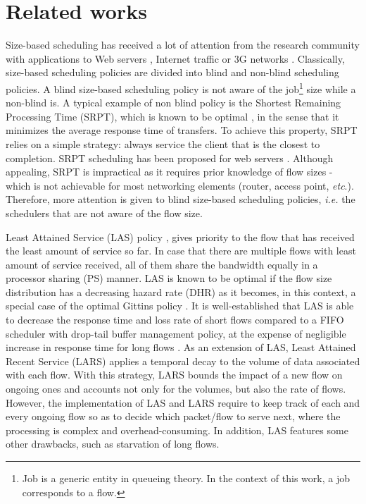 \documentclass[preprint,12pt]{elsarticle}
\begin{document}
\section{Related works}
\label{sec:related}
Size-based scheduling has received a lot of attention from the research community with applications to Web servers \cite{SRPT_Web2006}, Internet traffic \cite{Avrachenkov04Run2c,Rai2004Performance,Keller2008Improving} or 3G networks \cite{Aalto2007Impact,Lassila2008Combining}. Classically, size-based scheduling policies are divided into blind and non-blind scheduling policies. A blind size-based scheduling policy is not aware of the job\footnote{Job is a generic entity in queueing theory. In the context of this work, a job corresponds to a flow.} size while a non-blind is. A typical example of non blind policy is the Shortest Remaining Processing Time (SRPT), which is known to be optimal \cite{Schrage1968SRPT}, in the sense that it minimizes the average response time of transfers. To achieve this property, SRPT relies on a simple strategy: always service the client that is the closest to completion. SRPT scheduling has been proposed for web servers \cite{Chen03cnetworks,Harchol2003}. Although appealing, SRPT is impractical as it requires prior knowledge of flow sizes - which is not achievable for most networking elements (router, access point, \textit{etc}.). Therefore, more attention is given to blind size-based scheduling policies, \textit{i.e.} the schedulers that are not aware of the flow size.

 Least Attained Service (LAS) policy \cite{Rai02size-basedscheduling}, gives priority to the flow that has received the least amount of service so far. In case that there are multiple flows with least amount of service received, all of them share the bandwidth equally in a processor sharing (PS) manner. LAS is known to be optimal if the flow size distribution has a decreasing hazard rate (DHR) \cite{Nuyens2008FB} as it becomes, in this context, a special case of the optimal Gittins policy \cite{Gittins89}.  It is well-established that LAS is able to decrease the response time and loss rate of short flows compared to a FIFO scheduler with drop-tail buffer management policy, at the expense of negligible increase in response time for long flows \cite{Rai02size-basedscheduling,Rai04size-basedscheduling,Rai04performancemodels}. As an extension of LAS, Least Attained Recent Service (LARS) \cite{Martin10Lars} applies a temporal decay to the volume of data associated with each flow. With this strategy, LARS bounds the impact of a new flow on ongoing ones and accounts not only for the volumes, but also the rate of flows. However, the implementation of LAS and LARS require to keep track of each and every ongoing flow so as to decide which packet/flow to serve next, where the processing is complex and overhead-consuming. In addition, LAS features some other drawbacks, such as starvation of long flows.%
\end{document}
